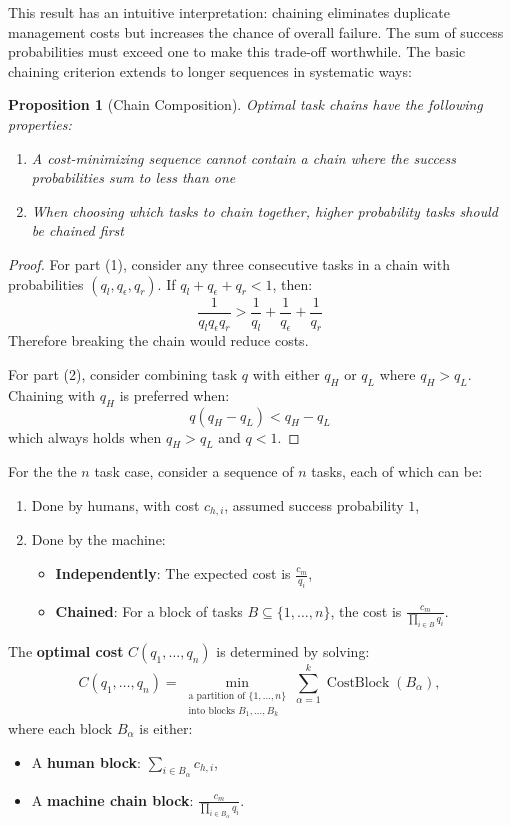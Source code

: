 \documentclass{article}
\DeclareMathOperator{\CostBlock}{CostBlock}
\newtheorem{proposition}[theorem]{Proposition}
\begin{document}
This result has an intuitive interpretation: chaining eliminates duplicate management costs but increases the chance of overall failure.
The sum of success probabilities must exceed one to make this trade-off worthwhile.
The basic chaining criterion extends to longer sequences in systematic ways:

\begin{proposition}[Chain Composition]
Optimal task chains have the following properties:
\begin{enumerate}
\item A cost-minimizing sequence cannot contain a chain where the success probabilities sum to less than one
\item When choosing which tasks to chain together, higher probability tasks should be chained first
\end{enumerate}
\end{proposition}

\begin{proof}
For part (1), consider any three consecutive tasks in a chain with probabilities $(q_l, q_\epsilon, q_r)$.
If $q_l + q_\epsilon + q_r < 1$, then:
\[\frac{1}{q_lq_\epsilon q_r} > \frac{1}{q_l} + \frac{1}{q_\epsilon} + \frac{1}{q_r}\]
Therefore breaking the chain would reduce costs.

For part (2), consider combining task $q$ with either $q_H$ or $q_L$ where $q_H > q_L$.
Chaining with $q_H$ is preferred when:
\[q(q_H - q_L) < q_H - q_L\]
which always holds when $q_H > q_L$ and $q < 1$.
\end{proof}

For the the $n$ task case, consider a sequence of \(n\) tasks, each of which can be:
\begin{enumerate}
    \item Done by humans, with cost \(c_{h,i}\), assumed success probability \(1\),
    \item Done by the machine:
    \begin{itemize}
        \item \textbf{Independently}: The expected cost is \(\frac{c_m}{q_i}\),
        \item \textbf{Chained}: For a block of tasks \(B \subseteq \{1, \dots, n\}\), the cost is \(\frac{c_m}{\prod_{i \in B} q_i}\).
    \end{itemize}
\end{enumerate}

The \textbf{optimal cost} \(C(q_1, \dots, q_n)\) is determined by solving:
\[
C(q_1, \dots, q_n) = \min_{\substack{\text{a partition of } \{1, \dots, n\} \\ \text{into blocks } B_1, \dots, B_k}} \sum_{\alpha=1}^k \CostBlock(B_\alpha),
\]
where each block \(B_\alpha\) is either:
\begin{itemize}
    \item A \textbf{human block}: \(\sum_{i \in B_\alpha} c_{h,i}\),
    \item A \textbf{machine chain block}: \(\frac{c_m}{\prod_{i \in B_\alpha} q_i}\).
\end{itemize}
\end{document}
